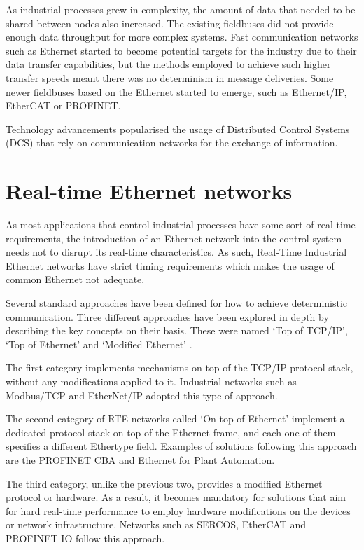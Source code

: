 \documentclass[a4paper]{IEEEtran}
\begin{document}
As industrial processes grew in complexity, the amount of data that needed to be shared between nodes also increased.
The existing fieldbuses did not provide enough data throughput for more complex systems.
Fast communication networks such as Ethernet started to become potential targets for the industry due to their data
transfer capabilities, but the methods employed to achieve such higher transfer speeds meant there was no determinism in message deliveries.
Some newer fieldbuses based on the Ethernet started to emerge, such as Ethernet/IP, EtherCAT or PROFINET.

Technology advancements popularised the usage of Distributed Control Systems (DCS) that rely on communication networks for the exchange of information.

\section{Real-time Ethernet networks}
As  most  applications  that  control  industrial  processes  have  some  sort  of  real-time  requirements,  the introduction of an Ethernet network into the control system needs not to disrupt its real-time characteristics.
As such, Real-Time Industrial Ethernet networks have strict timing requirements which makes the usage of common Ethernet not adequate.

Several standard approaches have been defined for how to achieve deterministic communication.
Three different approaches have been explored in depth by describing the key concepts on their basis.
These were named ‘Top of TCP/IP’, ‘Top of Ethernet’ and ‘Modified Ethernet’ \cite{rte:rte-for-automation}.

The first category implements mechanisms on top of the TCP/IP protocol stack, without any modifications applied to it.
Industrial networks such as Modbus/TCP and EtherNet/IP adopted this type of approach.

The second category of RTE networks called ‘On top of Ethernet’ implement a dedicated protocol stack on top of the Ethernet frame, and each one of them specifies a different Ethertype field.
Examples of solutions following this approach are the PROFINET CBA and Ethernet for Plant Automation.

The third category, unlike the previous two, provides a modified Ethernet protocol or hardware.
As a result, it becomes mandatory for solutions that aim for hard real-time performance to employ hardware modifications on the devices or network infrastructure.
Networks such as SERCOS, EtherCAT and PROFINET IO follow this approach.
\end{document}
